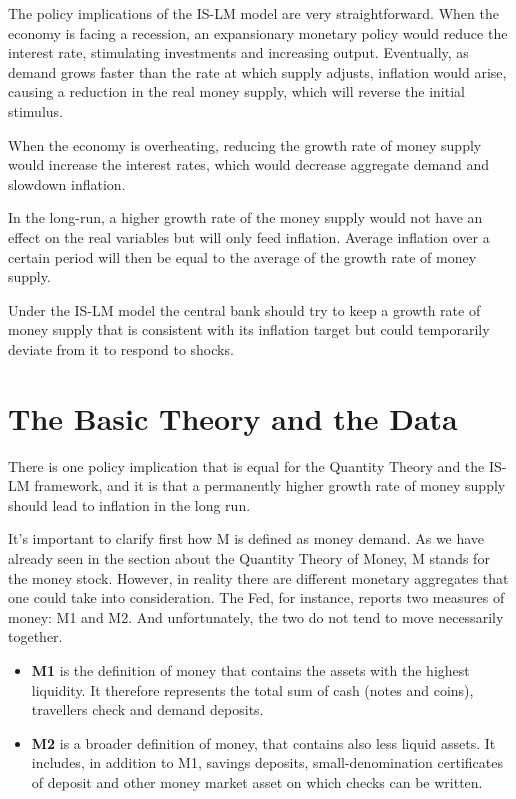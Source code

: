 \documentclass[11pt,a4paper,oneside]{book}
\begin{document}
The policy implications of the IS-LM model are very straightforward. When the economy is facing a recession, an expansionary monetary policy would reduce the interest rate, stimulating investments and increasing output. Eventually, as demand grows faster than the rate at which supply adjusts, inflation would arise, causing a reduction in the real money supply, which will reverse the initial stimulus.

When the economy is overheating, reducing the growth rate of money supply would increase the interest rates, which would decrease aggregate demand and slowdown inflation.

In the long-run, a higher growth rate of the money supply would not have an effect on the real variables but will only feed inflation. Average inflation over a certain period will then be equal to the average of the growth rate of money supply.

Under the IS-LM model the central bank should try to keep a growth rate of money supply that is consistent with its inflation target but could temporarily deviate from it to respond to shocks.

\section{The Basic Theory and the Data}
\label{sec:Basic_Theory_Data}
There is one policy implication that is equal for the Quantity Theory and the IS-LM framework, and it is that a permanently higher growth rate of money supply should lead to inflation in the long run.

It's important to clarify first how M is defined as money demand. As we have already seen in the section about the Quantity Theory of Money, M stands for the money stock. However, in reality there are different monetary aggregates that one could take into consideration. The Fed, for instance, reports two measures of money: M1 and M2. And unfortunately, the two do not tend to move necessarily together.
\begin{itemize}
  \item \textbf{M1} is the definition of money that contains the assets with the highest liquidity. It therefore represents the total sum of cash (notes and coins), travellers check and demand deposits.
  \item \textbf{M2} is a broader definition of money, that contains also less liquid assets. It includes, in addition to M1, savings deposits, small-denomination certificates of deposit and other money market asset on which checks can be written.
\end{itemize}
\end{document}
